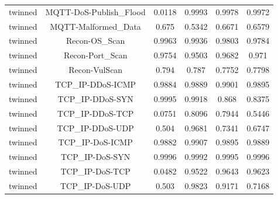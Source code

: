 \begin{table}[htbp]
\begin{tabular}{lccccc}
twinned & MQTT-DoS-Publish\_Flood & 0.0118 & 0.9993 & 0.9978 & 0.9972 \\
twinned & MQTT-Malformed\_Data & 0.675 & 0.5342 & 0.6671 & 0.6579 \\
twinned & Recon-OS\_Scan & 0.9963 & 0.9936 & 0.9803 & 0.9784 \\
twinned & Recon-Port\_Scan & 0.9754 & 0.9503 & 0.9682 & 0.971 \\
twinned & Recon-VulScan & 0.794 & 0.787 & 0.7752 & 0.7798 \\
twinned & TCP\_IP-DDoS-ICMP & 0.9884 & 0.9889 & 0.9901 & 0.9895 \\
twinned & TCP\_IP-DDoS-SYN & 0.9995 & 0.9918 & 0.868 & 0.8375 \\
twinned & TCP\_IP-DDoS-TCP & 0.0751 & 0.8096 & 0.7944 & 0.5446 \\
twinned & TCP\_IP-DDoS-UDP & 0.504 & 0.9681 & 0.7341 & 0.6747 \\
twinned & TCP\_IP-DoS-ICMP & 0.9882 & 0.9907 & 0.9895 & 0.9889 \\
twinned & TCP\_IP-DoS-SYN & 0.9996 & 0.9992 & 0.9995 & 0.9996 \\
twinned & TCP\_IP-DoS-TCP & 0.0482 & 0.9522 & 0.9643 & 0.9623 \\
twinned & TCP\_IP-DoS-UDP & 0.503 & 0.9823 & 0.9171 & 0.7168 \\
\bottomrule
\end{tabular}
\end{table}